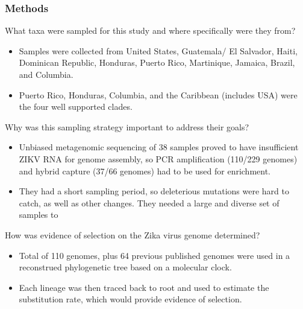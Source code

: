 \documentclass[12pt,a4paper]{article}
\begin{document}
\subsubsection{Methods}
\begin{itemize}
    {\color{G-Moon}\item What taxa were sampled for this study and where specifically were they from?}
        \begin{itemize}
            \item Samples were collected from United States, Guatemala/ El Salvador, Haiti, Dominican Republic, Honduras, Puerto Rico, Martinique, Jamaica, Brazil, and Columbia.
            \item Puerto Rico, Honduras, Columbia, and the Caribbean (includes USA) were the four well supported clades.
        \end{itemize}
    {\color{G-Moon}\item Why was this sampling strategy important to address their goals?}
        \begin{itemize}
            \item Unbiased metagenomic sequencing of 38 samples proved to have insufficient ZIKV RNA for genome assembly, so PCR amplification (110/229 genomes) and hybrid capture (37/66 genomes) had to be used for enrichment.
            \item They had a short sampling period, so deleterious mutations were hard to catch, as well as other changes. They needed a large and diverse set of samples to 
        \end{itemize}
    {\color{G-Moon}\item How was evidence of selection on the Zika virus genome determined?}
        \begin{itemize}
            \item Total of 110 genomes, plus 64 previous published genomes were used in a reconstrued phylogenetic tree based on a molecular clock. 
            \item Each lineage was then traced back to root and used to estimate the substitution rate, which would provide evidence of selection.
        \end{itemize}
\end{itemize}
\end{document}
